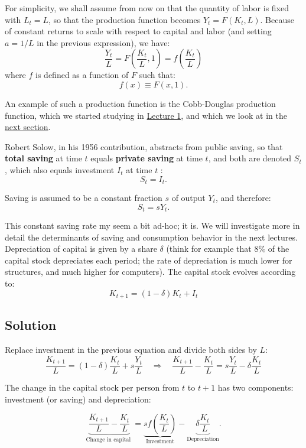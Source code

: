 \documentclass[]{book}
\theoremstyle{definition}
\theoremstyle{definition}
\theoremstyle{definition}
\theoremstyle{remark}
\begin{document}
For simplicity, we shall assume from now on that the quantity of labor
is fixed with \(L_t=L\), so that the production function becomes
\(Y_t=F(K_t, L)\). Because of constant returns to scale with respect to
capital and labor (and setting \(a=1/L\) in the previous expression), we
have:
\[\frac{Y_t}{L}=F\left(\frac{K_t}{L},1\right)=f\left(\frac{K_t}{L}\right)\]
where \(f\) is defined as a function of \(F\) such that:
\[f(x)\equiv F(x,1).\]

An example of such a production function is the Cobb-Douglas production
function, which we started studying in
\protect\hyperlink{intro-cobb}{Lecture 1}, and which we look at in the
\protect\hyperlink{cobb}{next section}.

Robert Solow, in his 1956 contribution, abstracts from public saving, so
that \textbf{total saving} at time \(t\) equals \textbf{private saving}
at time \(t\), and both are denoted \(S_{t}\), which also equals
investment \(I_{t}\) at time \(t\) : \[S_{t}=I_{t}.\]

Saving is assumed to be a constant fraction \(s\) of output \(Y_{t}\),
and therefore: \[S_{t}=sY_{t}.\]

This constant saving rate my seem a bit ad-hoc; it is. We will
investigate more in detail the determinants of saving and consumption
behavior in the next lectures. Depreciation of capital is given by a
share \(\delta\) (think for example that 8\% of the capital stock
depreciates each period; the rate of depreciation is much lower for
structures, and much higher for computers). The capital stock evolves
according to: \[K_{t+1}=\left(1-\delta\right)K_{t}+I_{t}\]

\subsection{Solution}\label{solution}

Replace investment in the previous equation and divide both sides by
\(L\):
\[\frac{K_{t+1}}{L} =\left(1-\delta\right)\frac{K_{t}}{L}+s\frac{Y_{t}}{L}\quad\Rightarrow\quad\boxed{\frac{K_{t+1}}{L}-\frac{K_{t}}{L}=s\frac{Y_{t}}{L}-\delta\frac{K_{t}}{L}}\]

The change in the capital stock per person from \(t\) to \(t+1\) has two
components: investment (or saving) and depreciation:

\[\underbrace{\frac{K_{t+1}}{L}-\frac{K_{t}}{L}}_{\text{Change in capital }}=\underbrace{sf\left(\frac{K_{t}}{L}\right)}_{\text{Investment}}-\underbrace{\delta\frac{K_{t}}{L}}_{\text{Depreciation}}.\]
\end{document}
